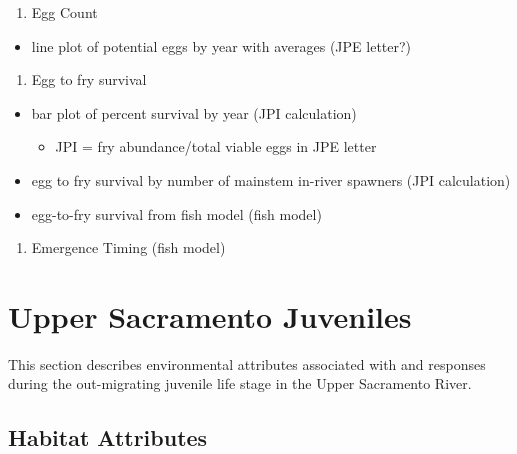\documentclass[
]{book}
\providecommand{\tightlist}{%
  \setlength{\itemsep}{0pt}\setlength{\parskip}{0pt}}
\theoremstyle{definition}
\theoremstyle{definition}
\theoremstyle{definition}
\theoremstyle{definition}
\theoremstyle{remark}
\begin{document}
\begin{enumerate}
\def\labelenumi{\arabic{enumi}.}
\tightlist
\item
  Egg Count
\end{enumerate}

\begin{itemize}
\tightlist
\item
  line plot of potential eggs by year with averages (JPE letter?)
\end{itemize}

\begin{enumerate}
\def\labelenumi{\arabic{enumi}.}
\setcounter{enumi}{1}
\tightlist
\item
  Egg to fry survival
\end{enumerate}

\begin{itemize}
\tightlist
\item
  bar plot of percent survival by year (JPI calculation)

  \begin{itemize}
  \tightlist
  \item
    JPI = fry abundance/total viable eggs in JPE letter
  \end{itemize}
\item
  egg to fry survival by number of mainstem in-river spawners (JPI calculation)
\item
  egg-to-fry survival from fish model (fish model)
\end{itemize}

\begin{enumerate}
\def\labelenumi{\arabic{enumi}.}
\setcounter{enumi}{2}
\tightlist
\item
  Emergence Timing (fish model)
\end{enumerate}

\hypertarget{upper-sacramento-juveniles}{%
\chapter{Upper Sacramento Juveniles}\label{upper-sacramento-juveniles}}

This section describes environmental attributes associated with and responses during the out-migrating juvenile life stage in the Upper Sacramento River.

\hypertarget{habitat-attributes-2}{%
\section{Habitat Attributes}\label{habitat-attributes-2}}
\end{document}
